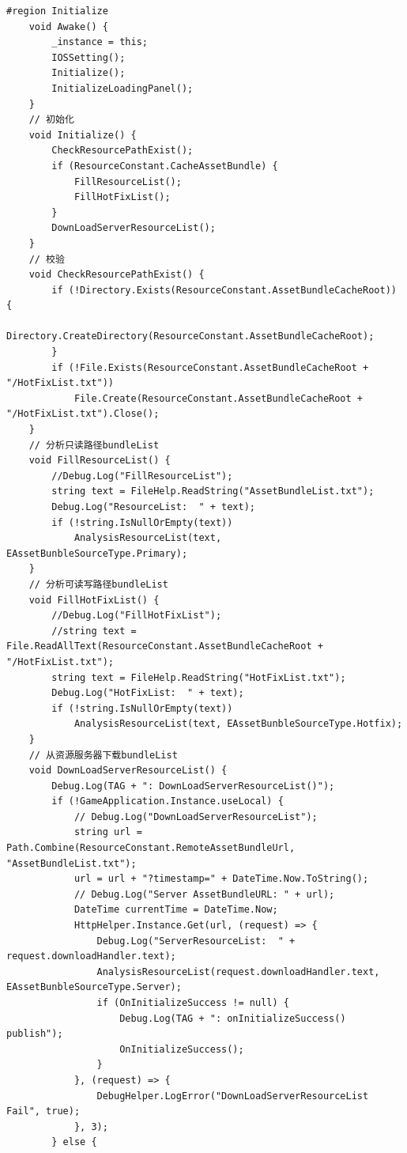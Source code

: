 \documentclass[9pt, b5paper]{article}
\begin{document}
\begin{verbatim}
#region Initialize
    void Awake() {
        _instance = this;
        IOSSetting();
        Initialize();
        InitializeLoadingPanel();
    }
    // 初始化
    void Initialize() {
        CheckResourcePathExist();
        if (ResourceConstant.CacheAssetBundle) {
            FillResourceList();
            FillHotFixList();
        }
        DownLoadServerResourceList();
    }
    // 校验
    void CheckResourcePathExist() {
        if (!Directory.Exists(ResourceConstant.AssetBundleCacheRoot)) {
            Directory.CreateDirectory(ResourceConstant.AssetBundleCacheRoot);
        }
        if (!File.Exists(ResourceConstant.AssetBundleCacheRoot + "/HotFixList.txt")) 
            File.Create(ResourceConstant.AssetBundleCacheRoot + "/HotFixList.txt").Close();
    }
    // 分析只读路径bundleList
    void FillResourceList() {
        //Debug.Log("FillResourceList");
        string text = FileHelp.ReadString("AssetBundleList.txt");
        Debug.Log("ResourceList:  " + text);
        if (!string.IsNullOrEmpty(text)) 
            AnalysisResourceList(text, EAssetBunbleSourceType.Primary);
    }
    // 分析可读写路径bundleList
    void FillHotFixList() {
        //Debug.Log("FillHotFixList");
        //string text = File.ReadAllText(ResourceConstant.AssetBundleCacheRoot + "/HotFixList.txt");
        string text = FileHelp.ReadString("HotFixList.txt");
        Debug.Log("HotFixList:  " + text);
        if (!string.IsNullOrEmpty(text)) 
            AnalysisResourceList(text, EAssetBunbleSourceType.Hotfix);
    }
    // 从资源服务器下载bundleList
    void DownLoadServerResourceList() {
        Debug.Log(TAG + ": DownLoadServerResourceList()"); 
        if (!GameApplication.Instance.useLocal) {
            // Debug.Log("DownLoadServerResourceList");
            string url = Path.Combine(ResourceConstant.RemoteAssetBundleUrl, "AssetBundleList.txt");
            url = url + "?timestamp=" + DateTime.Now.ToString();
            // Debug.Log("Server AssetBundleURL: " + url);
            DateTime currentTime = DateTime.Now;
            HttpHelper.Instance.Get(url, (request) => {
                Debug.Log("ServerResourceList:  " + request.downloadHandler.text);
                AnalysisResourceList(request.downloadHandler.text, EAssetBunbleSourceType.Server);
                if (OnInitializeSuccess != null) {
                    Debug.Log(TAG + ": onInitializeSuccess() publish"); 
                    OnInitializeSuccess();
                }
            }, (request) => {
                DebugHelper.LogError("DownLoadServerResourceList Fail", true);
            }, 3);
        } else {

\end{verbatim}
\end{document}
